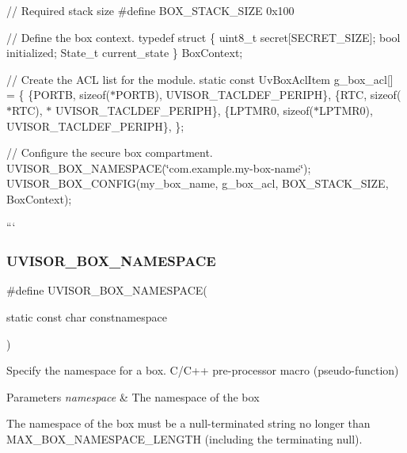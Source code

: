 // Required stack size \#define B\+O\+X\+\_\+\+S\+T\+A\+C\+K\+\_\+\+S\+I\+ZE 0x100

// Define the box context. typedef struct \{ uint8\+\_\+t secret\mbox{[}S\+E\+C\+R\+E\+T\+\_\+\+S\+I\+ZE\mbox{]}; bool initialized; State\+\_\+t current\+\_\+state \} Box\+Context;

// Create the A\+CL list for the module. static const Uv\+Box\+Acl\+Item g\+\_\+box\+\_\+acl\mbox{[}\mbox{]} = \{ \{P\+O\+R\+TB, sizeof($\ast$\+P\+O\+R\+T\+B), U\+V\+I\+S\+O\+R\+\_\+\+T\+A\+C\+L\+D\+E\+F\+\_\+\+P\+E\+R\+I\+PH\}, \{R\+TC, sizeof($\ast$\+R\+T\+C), $\ast$ U\+V\+I\+S\+O\+R\+\_\+\+T\+A\+C\+L\+D\+E\+F\+\_\+\+P\+E\+R\+I\+PH\}, \{L\+P\+T\+M\+R0, sizeof($\ast$\+L\+P\+T\+M\+R0), U\+V\+I\+S\+O\+R\+\_\+\+T\+A\+C\+L\+D\+E\+F\+\_\+\+P\+E\+R\+I\+PH\}, \};

// Configure the secure box compartment. U\+V\+I\+S\+O\+R\+\_\+\+B\+O\+X\+\_\+\+N\+A\+M\+E\+S\+P\+A\+CE(\char`\"{}com.\+example.\+my-\/box-\/name\char`\"{}); U\+V\+I\+S\+O\+R\+\_\+\+B\+O\+X\+\_\+\+C\+O\+N\+F\+IG(my\+\_\+box\+\_\+name, g\+\_\+box\+\_\+acl, B\+O\+X\+\_\+\+S\+T\+A\+C\+K\+\_\+\+S\+I\+ZE, Box\+Context);

``` \hypertarget{group__hypervisor_gafe52bfcc466d459d149c63966c2f4a58}{}\label{group__hypervisor_gafe52bfcc466d459d149c63966c2f4a58} 
\subsubsection{\texorpdfstring{U\+V\+I\+S\+O\+R\+\_\+\+B\+O\+X\+\_\+\+N\+A\+M\+E\+S\+P\+A\+CE}{UVISOR\_BOX\_NAMESPACE}}
{\footnotesize\ttfamily \#define U\+V\+I\+S\+O\+R\+\_\+\+B\+O\+X\+\_\+\+N\+A\+M\+E\+S\+P\+A\+CE(\begin{DoxyParamCaption}\item[{}]{static const char constnamespace }\end{DoxyParamCaption})}



Specify the namespace for a box. C/\+C++ pre-\/processor macro (pseudo-\/function) 


\begin{DoxyParams}{Parameters}
{\em namespace} & The namespace of the box\\
\hline
\end{DoxyParams}
The namespace of the box must be a null-\/terminated string no longer than M\+A\+X\+\_\+\+B\+O\+X\+\_\+\+N\+A\+M\+E\+S\+P\+A\+C\+E\+\_\+\+L\+E\+N\+G\+TH (including the terminating null).

